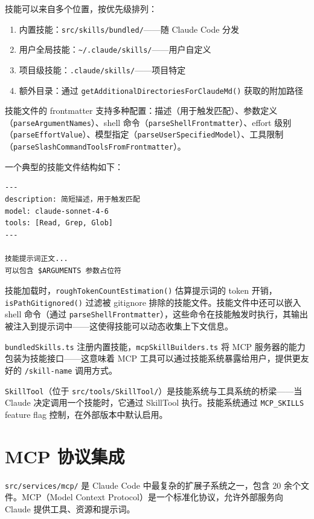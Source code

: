 技能可以来自多个位置，按优先级排列：

\begin{enumerate}
  \item 内置技能：\texttt{src/skills/bundled/}——随 Claude Code 分发
  \item 用户全局技能：\texttt{\~{}/.claude/skills/}——用户自定义
  \item 项目级技能：\texttt{.claude/skills/}——项目特定
  \item 额外目录：通过 \texttt{getAdditionalDirectoriesForClaudeMd()} 获取的附加路径
\end{enumerate}

技能文件的 frontmatter 支持多种配置：描述（用于触发匹配）、参数定义（\texttt{parseArgumentNames}）、shell 命令（\texttt{parseShellFrontmatter}）、effort 级别（\texttt{parseEffortValue}）、模型指定（\texttt{parseUserSpecifiedModel}）、工具限制（\texttt{parseSlashCommandToolsFromFrontmatter}）。

一个典型的技能文件结构如下：

\begin{lstlisting}[language={}]
---
description: 简短描述，用于触发匹配
model: claude-sonnet-4-6
tools: [Read, Grep, Glob]
---

技能提示词正文...
可以包含 $ARGUMENTS 参数占位符
\end{lstlisting}

技能加载时，\texttt{roughTokenCountEstimation()} 估算提示词的 token 开销，\texttt{isPathGitignored()} 过滤被 gitignore 排除的技能文件。技能文件中还可以嵌入 shell 命令（通过 \texttt{parseShellFrontmatter}），这些命令在技能触发时执行，其输出被注入到提示词中——这使得技能可以动态收集上下文信息。

\texttt{bundledSkills.ts} 注册内置技能，\texttt{mcpSkillBuilders.ts} 将 MCP 服务器的能力包装为技能接口——这意味着 MCP 工具可以通过技能系统暴露给用户，提供更友好的 \texttt{/skill-name} 调用方式。

\texttt{SkillTool}（位于 \texttt{src/tools/SkillTool/}）是技能系统与工具系统的桥梁——当 Claude 决定调用一个技能时，它通过 SkillTool 执行。技能系统通过 \texttt{MCP\_SKILLS} feature flag 控制，在外部版本中默认启用。

\section{MCP 协议集成}

\texttt{src/services/mcp/} 是 Claude Code 中最复杂的扩展子系统之一，包含 20 余个文件。MCP（Model Context Protocol）是一个标准化协议，允许外部服务向 Claude 提供工具、资源和提示词。

